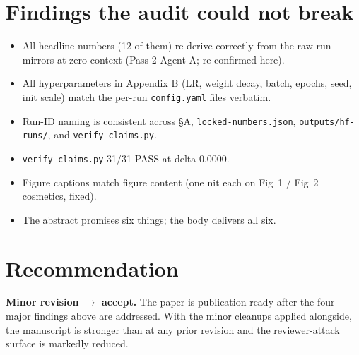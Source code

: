 \documentclass[11pt,a4paper]{article}
\begin{document}
\section{Findings the audit could not break}

\begin{itemize}[leftmargin=2em]
\item All headline numbers (12 of them) re-derive correctly from the raw
      run mirrors at zero context (Pass 2 Agent A; re-confirmed here).
\item All hyperparameters in Appendix B (LR, weight decay, batch, epochs,
      seed, init scale) match the per-run \texttt{config.yaml} files
      verbatim.
\item Run-ID naming is consistent across \S A, \texttt{locked-numbers.json},
      \texttt{outputs/hf-runs/}, and \texttt{verify\_claims.py}.
\item \texttt{verify\_claims.py} 31/31 PASS at delta $0.0000$.
\item Figure captions match figure content (one nit each on Fig~1 / Fig~2
      cosmetics, fixed).
\item The abstract promises six things; the body delivers all six.
\end{itemize}

\section{Recommendation}

\textbf{Minor revision $\to$ accept.} The paper is publication-ready after
the four major findings above are addressed. With the minor cleanups
applied alongside, the manuscript is stronger than at any prior revision
and the reviewer-attack surface is markedly reduced.
\end{document}
